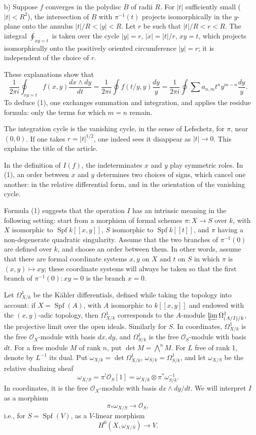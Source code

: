 \documentclass[11pt]{article}
\DeclareMathOperator{\Spf}{Spf}
\newcommand{\OO}{\mathcal O}
\begin{document}
\noindent b) Suppose $f$ converges in the polydisc $B$ of radii $R$. For $|t|$ sufficiently small ($|t|<R^2$), the intersection of $B$ with $\pi^{-1}(t)$ projects isomorphically in the $y$-plane onto the annulus $|t|/R<|y|<R$. Let $r$ be such that $|t|/R<r<R$. The integral $\oint_{xy=t}$ is taken over the cycle $|y|=r$, $|x|=|t|/r$, $xy=t$, which projects isomorphically onto the positively oriented circumference $|y|=r$; it is independent of the choice of $r$.

These explanations show that
\[
\frac{1}{2\pi i}\oint_{xy=t} f(x,y)\frac{dx\wedge dy}{dt}
=\frac{1}{2\pi i}\oint f(t/y,y)\frac{dy}{y}
=\frac{1}{2\pi i}\oint\sum a_{n,m}t^n y^{m-n}\frac{dy}{y}.
\]
To deduce (1), one exchanges summation and integration, and applies the residue formula: only the terms for which $m=n$ remain.

The integration cycle is the vanishing cycle, in the sense of Lefschetz, for $\pi$, near $(0,0)$. If one takes $r=|t|^{1/2}$, one indeed sees it disappear as $|t|\to0$. This explains the title of the article.

In the definition of $I(f)$, the indeterminates $x$ and $y$ play symmetric roles. In (1), an order between $x$ and $y$ determines two choices of signs, which cancel one another: in the relative differential form, and in the orientation of the vanishing cycle.

Formula (1) suggests that the operation $I$ has an intrinsic meaning in the following setting: start from a morphism of formal schemes $\pi:X\to S$ over $k$, with $X$ isomorphic to $\Spf k[[x,y]]$, $S$ isomorphic to $\Spf k[[t]]$, and $\pi$ having a non-degenerate quadratic singularity. Assume that the two branches of $\pi^{-1}(0)$ are defined over $k$, and choose an order between them. In other words, assume that there are formal coordinate systems $x,y$ on $X$ and $t$ on $S$ in which $\pi$ is $(x,y)\mapsto xy$; these coordinate systems will always be taken so that the first branch of $\pi^{-1}(0):xy=0$ is the branch $x=0$.

Let $\Omega^1_{X/k}$ be the Kähler differentials, defined while taking the topology into account: if $X=\Spf(A)$, with $A$ isomorphic to $k[[x,y]]$ and endowed with the $(x,y)$-adic topology, then $\Omega^1_{X/k}$ corresponds to the $A$-module $\varprojlim\Omega^1_{(A/I)/k}$, the projective limit over the open ideals. Similarly for $S$. In coordinates, $\Omega^1_{X/k}$ is the free $\OO_X$-module with basis $dx,dy$, and $\Omega^1_{S/k}$ is the free $\OO_S$-module with basis $dt$. For a free module $M$ of rank $n$, put $\det M=\bigwedge^nM$. For $L$ free of rank 1, denote by $L^{-1}$ its dual. Put $\omega_{X/k}=\det\Omega^1_{X/k}$, $\omega_{S/k}=\Omega^1_{S/k}$, and let $\omega_{X/S}$ be the relative dualizing sheaf
\[
        \omega_{X/S}=\pi^!\OO_S[1]=\omega_{X/k}\otimes\pi^*\omega_{S/k}^{-1}.
\]
In coordinates, it is the free $\OO_X$-module with basis $dx\wedge dy/dt$. We will interpret $I$ as a morphism
\[
        \pi_*\omega_{X/S}\longrightarrow\OO_S,
\]
i.e., for $S=\Spf(V)$, as a $V$-linear morphism
\[
        H^0(X,\omega_{X/S})\longrightarrow V.
\]
\end{document}

